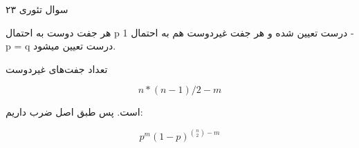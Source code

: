 سوال تئوری ۲۳

هر جفت دوست به احتمال
p
درست تعیین شده و هر جفت غیردوست هم به احتمال
1 - p = q
درست تعیین میشود.

تعداد جفت‌های غیردوست

$$
n * (n - 1) / 2 - m
$$

است.
پس طبق اصل ضرب داریم:

$$
p^m(1-p)^{\binom{n}{2}-m}
$$